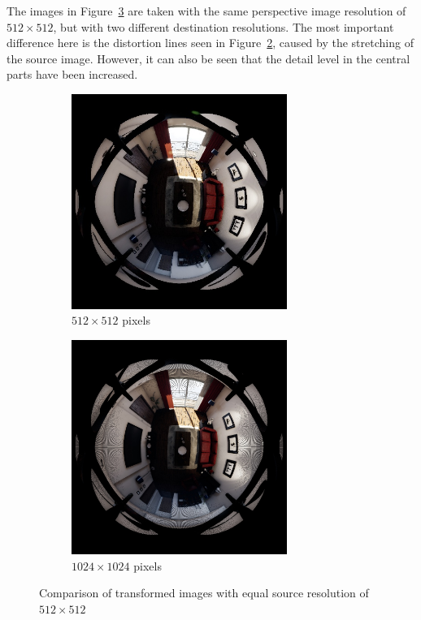 The images in Figure~\ref{fig:res_comp_equal} are taken with the same perspective image resolution of $512 \times 512$, but with two different destination resolutions. The most important difference here is the distortion lines seen in Figure~\ref{fig:res_comp_equal_512_1024}, caused by the stretching of the source image. However, it can also be seen that the detail level in the central parts have been increased.

\begin{figure}[!htb]
    \centering
    \begin{subfigure}{0.45\textwidth}
        \centering
        \includegraphics[height=7cm]{rapport/fig/Results/512to512.jpeg}
        \caption{$512 \times 512$ pixels}
        \label{fig:res_comp_equal_512_512}
    \end{subfigure}
    \begin{subfigure}{0.45\textwidth}
        \centering
        \includegraphics[height=7cm]{rapport/fig/Results/512to1024.jpeg}
        \caption{$1024 \times 1024$ pixels}
        \label{fig:res_comp_equal_512_1024}
    \end{subfigure}
    \caption{Comparison of transformed images with equal source resolution of $512 \times 512$}
    \label{fig:res_comp_equal}
\end{figure}

